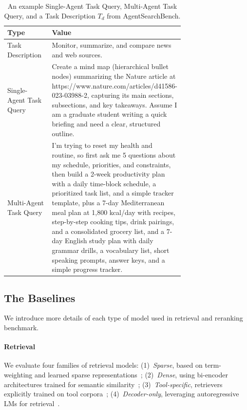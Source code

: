 \documentclass{article} %
\begin{document}
\begin{table}[t]
\centering
\small
\renewcommand{\arraystretch}{1.3}
\begin{tabular}{@{}lp{0.72\linewidth}@{}}
\toprule
\textbf{Type} & \textbf{Value} \\
\midrule
Task Description & Monitor, summarize, and compare news and web sources. \\[2pt]
Single-Agent Task Query & Create a mind map (hierarchical bullet nodes) summarizing
                   the Nature article at https://www.nature.com/articles/d41586-023-03988-2,
                   capturing its main sections, subsections, and key takeaways.
                   Assume I am a graduate student writing a quick briefing and
                   need a clear, structured outline. \\
Multi-Agent Task Query & I'm trying to reset my health and routine, so first ask me 5 questions about my schedule, priorities, and constraints, then build a 2-week productivity plan with a daily time-block schedule, a prioritized task list, and a simple tracker template, plus a 7-day Mediterranean meal plan at 1,800 kcal/day with recipes, step-by-step cooking tips, drink pairings, and a consolidated grocery list, and a 7-day English study plan with daily grammar drills, a vocabulary list, short speaking prompts, answer keys, and a simple progress tracker. \\
\bottomrule
\end{tabular}
\caption{An example Single-Agent Task Query, Multi-Agent Task Query, and a Task Description $T_d$ from AgentSearchBench.}
\label{tab:task-example}
\end{table}


\subsection{The Baselines}

We introduce more details of each type of model used in retrieval and reranking benchmark.

\paragraph{Retrieval} We evaluate four families of retrieval models:
(1)~\textit{Sparse}, based on term-weighting and learned sparse representations~\cite{robertson2009probabilistic, formal2021splade};
(2)~\textit{Dense}, using bi-encoder architectures trained for semantic similarity~\cite{santhanam2022colbertv2, izacard2021unsupervised, ni2022large, wang2021minilmv2, xiao2024cpack};
(3)~\textit{Tool-specific}, retrievers explicitly trained on tool corpora~\cite{qu2024towards, lu2025tools, zheng2403toolrerank, shi2025retrieval};
(4)~\textit{Decoder-only}, leveraging autoregressive LMs for retrieval~\cite{wang2024improving, DBLP:journals/corr/abs-2601-15621}.
\end{document}

